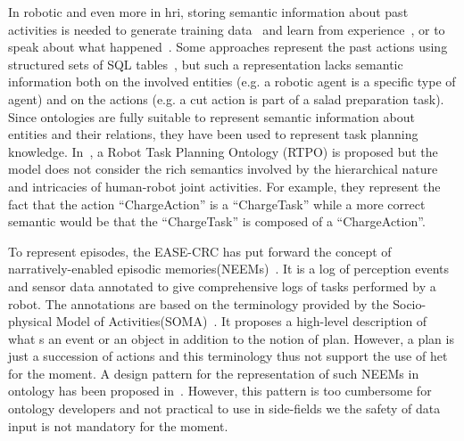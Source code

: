 In robotic and even more in \acrshort{hri}, storing semantic information about past activities is needed to generate training data~\cite{diab_2020_knowing} and learn from experience~\cite{petit_2016_reasoning}, or to speak about what happened~\cite{mealier_2017_narrative}. Some approaches represent the past actions using structured sets of SQL tables~\cite{mealier_2017_narrative}, but such a representation lacks semantic information both on the involved entities (e.g. a robotic agent is a specific type of agent) and on the actions (e.g. a cut action is part of a salad preparation task). Since ontologies are fully suitable to represent semantic information about entities and their relations, they have been used to represent task planning knowledge. In~\cite{sun_2019_rtpo}, a Robot Task Planning Ontology (RTPO) is proposed but the model does not consider the rich semantics involved by the hierarchical nature and intricacies of human-robot joint activities. For example, they represent the fact that the action ``ChargeAction'' is a ``ChargeTask'' while a more correct semantic would be that the ``ChargeTask'' is composed of a ``ChargeAction''.

To represent episodes, the EASE-CRC has put forward the concept of narratively-enabled episodic memories(NEEMs)~\cite{diab_2020_knowing}. It is a log of perception events and sensor data annotated to give comprehensive logs of tasks performed by a robot. The annotations are based on the terminology provided by the Socio-physical Model of Activities(SOMA)~\cite{bessler_2020_foundations}. It proposes a high-level description of what s an event or an object in addition to the notion of plan. However, a plan is just a succession of actions and this terminology thus not support the use of \acrshort{het} for the moment. A design pattern for the representation of such NEEMs in ontology has been proposed in~\cite{bernd_2020_modelling}. However, this pattern is too cumbersome for ontology developers and not practical to use in side-fields we the safety of data input is not mandatory for the moment.

